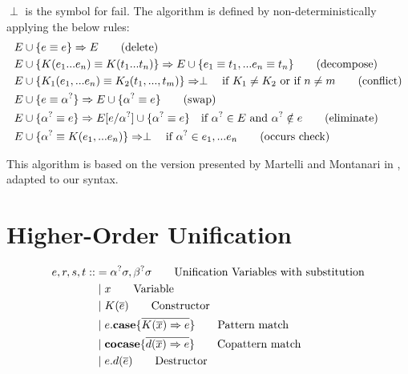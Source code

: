 \documentclass[twoside,12pt,a4paper]{article}
\begin{document}
\begin{definition}
    $\perp$ is the symbol for fail.
    The algorithm is defined by non-deterministically applying the below rules:
    \begin{align*}
        E & \cup \{ e \equiv e\} \Rightarrow E \tag{delete}\\
        E & \cup \{K(e_1 ... e_n) \equiv K(t_1 ... t_n)\} \Rightarrow E \cup \{e_1 \equiv t_1, ... e_n \equiv t_n\}\tag{decompose}\\
        E & \cup \{K_1(e_1,...e_n) \equiv K_2(t_1, ..., t_m)\}  \Rightarrow \perp \quad\text{if $K_1 \neq K_2$ or if $n\neq m$} \tag{conflict}\\
        E & \cup \{e \equiv \alpha^?\} \Rightarrow E \cup \{\alpha^? \equiv e\}\tag{swap}\\ 
        E & \cup \{\alpha^? \equiv e\} \Rightarrow E[e/\alpha^?] \cup \{\alpha^? \equiv e\} \quad\text{if $\alpha^? \in E$ and $\alpha^? \notin e$}  \tag{eliminate}\\
        E & \cup \{\alpha^? \equiv K(e_1,...e_n)\}\Rightarrow \perp \quad \text{if $\alpha^? \in e_1,...e_n$} \tag{occurs check} 
    \end{align*}
\end{definition} 

This algorithm is based on the version presented by Martelli and Montanari in \cite{10.1145/357162.357169},
adapted to our syntax.

\section{Higher-Order Unification}

\begin{definition}
    \begin{align*}
        e,r,s,t  ::&= \alphaunifvar\sigma, \betaunifvar\sigma \tag*{Unification Variables with substitution}\\ %
            &\partition x  \tag*{Variable} \\
            &\partition\constructor \tag*{Constructor} \\
            &\partition\patmatch  \tag*{Pattern match}\\
            &\partition\copatmatch  \tag*{Copattern match}\\
            &\partition\destructor  \tag*{Destructor}
    \end{align*}
\end{definition}
\end{document}
